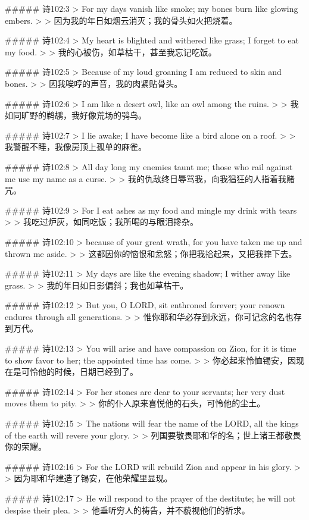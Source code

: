 ##### 诗102:3
> For my days vanish like smoke; my bones burn like glowing embers.
>
> 因为我的年日如烟云消灭；我的骨头如火把烧着。


##### 诗102:4
> My heart is blighted and withered like grass; I forget to eat my food.
>
> 我的心被伤，如草枯干，甚至我忘记吃饭。


##### 诗102:5
> Because of my loud groaning I am reduced to skin and bones.
>
> 因我唉哼的声音，我的肉紧贴骨头。


##### 诗102:6
> I am like a desert owl, like an owl among the ruins.
>
> 我如同旷野的鹈鹕，我好像荒场的鸮鸟。


##### 诗102:7
> I lie awake; I have become like a bird alone on a roof.
>
> 我警醒不睡，我像房顶上孤单的麻雀。


##### 诗102:8
> All day long my enemies taunt me; those who rail against me use my name as a curse.
>
> 我的仇敌终日辱骂我，向我猖狂的人指着我赌咒。


##### 诗102:9
> For I eat ashes as my food and mingle my drink with tears
>
> 我吃过炉灰，如同吃饭；我所喝的与眼泪搀杂。


##### 诗102:10
> because of your great wrath, for you have taken me up and thrown me aside.
>
> 这都因你的恼恨和忿怒；你把我拾起来，又把我摔下去。


##### 诗102:11
> My days are like the evening shadow; I wither away like grass.
>
> 我的年日如日影偏斜；我也如草枯干。


##### 诗102:12
> But you, O LORD, sit enthroned forever; your renown endures through all generations.
>
> 惟你耶和华必存到永远，你可记念的名也存到万代。


##### 诗102:13
> You will arise and have compassion on Zion, for it is time to show favor to her; the appointed time has come.
>
> 你必起来怜恤锡安，因现在是可怜他的时候，日期已经到了。


##### 诗102:14
> For her stones are dear to your servants; her very dust moves them to pity.
>
> 你的仆人原来喜悦他的石头，可怜他的尘土。


##### 诗102:15
> The nations will fear the name of the LORD, all the kings of the earth will revere your glory.
>
> 列国要敬畏耶和华的名；世上诸王都敬畏你的荣耀。


##### 诗102:16
> For the LORD will rebuild Zion and appear in his glory.
>
> 因为耶和华建造了锡安，在他荣耀里显现。


##### 诗102:17
> He will respond to the prayer of the destitute; he will not despise their plea.
>
> 他垂听穷人的祷告，并不藐视他们的祈求。


